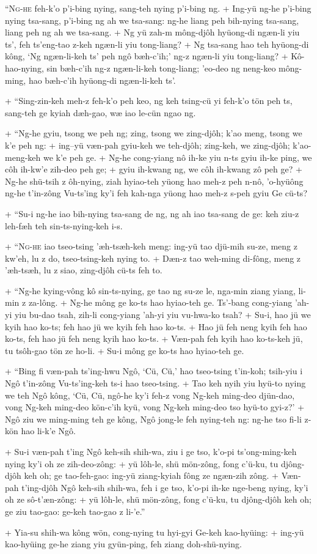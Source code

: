 \header
\lettrine{``N}{g-he} feh-k'o p'i-bing nying, sang-teh nying p'i-bing ng.
+	Ing-yü ng-he p'i-bing nying tsa-sang, p'i-bing ng ah we tsa-sang: ng-he liang peh bih-nying tsa-sang, liang peh ng ah we tsa-sang.
+	Ng yü zah-m mông-djôh hyüong-di ngæn-li yiu ts', feh ts'eng-tao z-keh ngæn-li yiu tong-liang?
+	Ng tsa-sang hao teh hyüong-di kông, `Ng ngæn-li-keh ts' peh ngô bæh-c'ih;' ng-z ngæn-li yiu tong-liang?
+	Kô-hao-nying, sin bæh-c'ih ng-z ngæn-li-keh tong-liang; 'eo-deo ng neng-keo mông-ming, hao bæh-c'ih hyüong-di ngæn-li-keh ts'.
\par
+	``Sing-zin-keh meh-z feh-k'o peh keo, ng keh tsing-cü yi feh-k'o tön peh ts, sang-teh ge kyiah dæh-gao, wæ iao le-cün ngao ng.
\par
+	``Ng-he gyiu, tsong we peh ng; zing, tsong we zing-djôh; k'ao meng, tsong we k'e peh ng:
+	ing--yü væn-pah gyiu-keh we teh-djôh; zing-keh, we zing-djôh; k'ao-meng-keh we k'e peh ge.
+	Ng-he cong-yiang nô ih-ke yiu n-ts gyiu ih-ke ping, we côh ih-kw'e zih-deo peh ge;
+	gyiu ih-kwang ng, we côh ih-kwang zô peh ge?
+	Ng-he shü-tsih z ôh-nying, ziah hyiao-teh yüong hao meh-z peh n-nô, 'o-hyüông ng-he t'in-zông Vu-ts'ing ky'i feh kah-nga yüong hao meh-z s-peh gyiu Ge cü-ts?
\par
+	``Su-i ng-he iao bih-nying tsa-sang de ng, ng ah iao tsa-sang de ge: keh ziu-z leh-fæh  teh sin-ts-nying-keh i-s.
\par
+	``\textsc{Ng-he} iao tseo-tsing 'æh-tsæh-keh meng: ing-yü tao djü-mih su-ze, meng z kw'eh, lu z do, tseo-tsing-keh nying to.
+	Dæn-z tao weh-ming di-fông, meng z 'æh-tsæh, lu z siao, zing-djôh cü-ts feh to.
\par
+	``Ng-he kying-vông kô sin-ts-nying, ge tao ng su-ze le, nga-min ziang yiang, li-min z za-lông.
+	Ng-he mông ge ko-ts hao hyiao-teh ge. Ts'-bang cong-yiang 'ah-yi yiu bu-dao tsah, zih-li cong-yiang 'ah-yi yiu vu-hwa-ko tsah?
+	Su-i, hao jü we kyih hao ko-ts; feh hao jü we kyih feh hao ko-ts.
+	Hao jü feh neng kyih feh hao ko-ts, feh hao jü feh neng kyih hao ko-ts.
+	Væn-pah feh kyih hao ko-ts-keh jü, tu tsôh-gao tön ze ho-li.
+	Su-i mông ge ko-ts hao hyiao-teh ge.
\par
+	``Bing fi væn-pah ts'ing-hwu Ngô, `Cü, Cü,' hao tseo-tsing t'in-koh; tsih-yiu i Ngô t'in-zông Vu-ts'ing-keh ts-i hao tseo-tsing.
+	Tao keh nyih yiu hyü-to nying we teh Ngô kông, `Cü, Cü, ngô-he ky'i feh-z vong Ng-keh ming-deo djün-dao, vong Ng-keh ming-deo kön-c'ih kyü, vong Ng-keh ming-deo tso hyü-to gyi-z?'
+	Ngô ziu we ming-ming teh ge kông, Ngô jong-le feh nying-teh ng: ng-he tso fi-li z-kön hao li-k'e Ngô.
\par
+	Su-i væn-pah t'ing Ngô keh-sih shih-wa, ziu i ge tso, k'o-pi ts'ong-ming-keh nying ky'i oh ze zih-deo-zông:
+	yü lôh-le, shü mön-zông, fong c'ü-ku, tu djông-djôh keh oh; ge tao-feh-gao: ing-yü ziang-kyiah fông ze ngæn-zih zông.
+	Væn-pah t'ing-djôh Ngô keh-sih shih-wa, feh i ge tso, k'o-pi ih-ke nge-beng nying, ky'i oh ze sô-t'æn-zông:
+	yü lôh-le, shü mön-zông, fong c'ü-ku, tu djông-djôh keh oh; ge ziu tao-gao: ge-keh tao-gao z li-'e.''
\par
+	Yia-su shih-wa kông wön, cong-nying tu hyi-gyi Ge-keh kao-hyüing:
+	ing-yü kao-hyüing ge-he ziang yiu gyün-ping, feh ziang doh-shü-nying.



